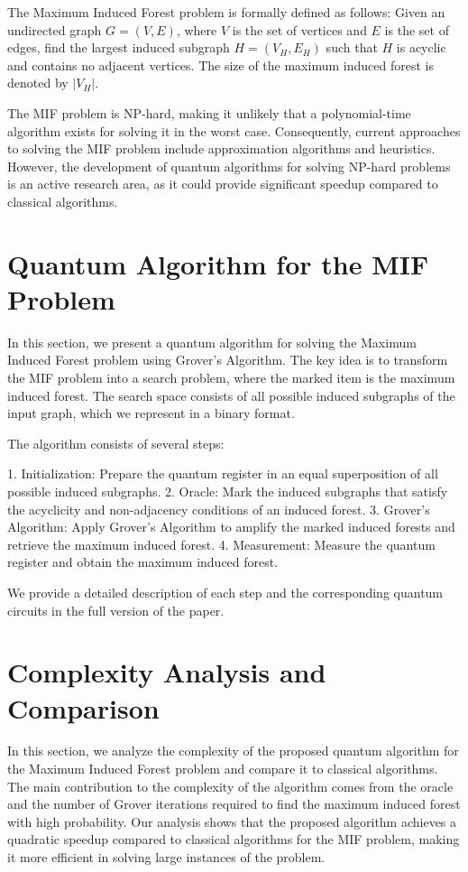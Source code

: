 The Maximum Induced Forest problem is formally defined as follows: Given an undirected graph $G = (V, E)$, where $V$ is the set of vertices and $E$ is the set of edges, find the largest induced subgraph $H = (V_H, E_H)$ such that $H$ is acyclic and contains no adjacent vertices. The size of the maximum induced forest is denoted by $|V_H|$.

The MIF problem is NP-hard, making it unlikely that a polynomial-time algorithm exists for solving it in the worst case. Consequently, current approaches to solving the MIF problem include approximation algorithms and heuristics. However, the development of quantum algorithms for solving NP-hard problems is an active research area, as it could provide significant speedup compared to classical algorithms.

\section{Quantum Algorithm for the MIF Problem}

In this section, we present a quantum algorithm for solving the Maximum Induced Forest problem using Grover's Algorithm. The key idea is to transform the MIF problem into a search problem, where the marked item is the maximum induced forest. The search space consists of all possible induced subgraphs of the input graph, which we represent in a binary format.

The algorithm consists of several steps:

1. Initialization: Prepare the quantum register in an equal superposition of all possible induced subgraphs.
2. Oracle: Mark the induced subgraphs that satisfy the acyclicity and non-adjacency conditions of an induced forest.
3. Grover's Algorithm: Apply Grover's Algorithm to amplify the marked induced forests and retrieve the maximum induced forest.
4. Measurement: Measure the quantum register and obtain the maximum induced forest.

We provide a detailed description of each step and the corresponding quantum circuits in the full version of the paper.

\section{Complexity Analysis and Comparison}

In this section, we analyze the complexity of the proposed quantum algorithm for the Maximum Induced Forest problem and compare it to classical algorithms. The main contribution to the complexity of the algorithm comes from the oracle and the number of Grover iterations required to find the maximum induced forest with high probability. Our analysis shows that the proposed algorithm achieves a quadratic speedup compared to classical algorithms for the MIF problem, making it more efficient in solving large instances of the problem.

